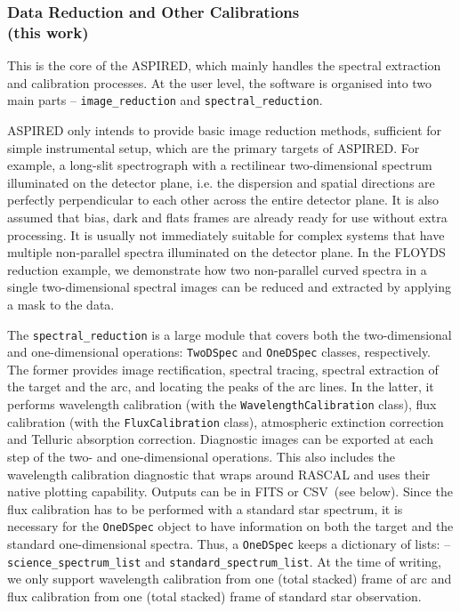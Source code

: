 \documentclass[linenumbers, twocolumn]{aastex631}
\begin{document}
\subsubsection*{Data Reduction and Other Calibrations\\(this work)}
This is the core of the \textsc{ASPIRED}, which mainly handles the spectral
extraction and calibration processes. At the user level, the software is
organised into two main parts -- \texttt{image\_reduction} and
\texttt{spectral\_reduction}.

\textsc{ASPIRED} only intends to provide basic image reduction methods,
sufficient for simple instrumental setup, which are the primary targets of
\textsc{ASPIRED}. For example, a long-slit spectrograph with a rectilinear
two-dimensional spectrum illuminated on the detector plane, i.e. the dispersion
and spatial directions are perfectly perpendicular to each other across the
entire detector plane. It is also assumed that bias, dark and flats frames
are already ready for use without extra processing. It is usually not
immediately suitable for complex systems that have multiple non-parallel
spectra illuminated on the detector plane. In the FLOYDS reduction example,
we demonstrate how two non-parallel curved spectra in a single two-dimensional
spectral images can be reduced and extracted by applying a mask to the data.

The \texttt{spectral\_reduction} is a large module that covers both the
two-dimensional and one-dimensional operations: \texttt{TwoDSpec} and
\texttt{OneDSpec} classes, respectively. The former provides image
rectification, spectral tracing, spectral extraction of the target and the
arc, and locating the peaks of the arc lines. In the latter, it performs
wavelength calibration (with the \texttt{WavelengthCalibration} class),
flux calibration (with the \texttt{FluxCalibration} class), atmospheric
extinction correction and Telluric absorption correction. Diagnostic images
can be exported at each step of the two- and one-dimensional operations.
This also includes the wavelength calibration diagnostic that wraps around
\textsc{RASCAL} and uses their native plotting capability. Outputs can be
in FITS or CSV~(see below). Since the flux calibration has to be performed
with a standard star spectrum, it is necessary for the \texttt{OneDSpec}
object to have information on both the target and the standard one-dimensional
spectra. Thus, a \texttt{OneDSpec} keeps a dictionary of lists: --
\texttt{science\_spectrum\_list} and \texttt{standard\_spectrum\_list}. At the
time of writing, we only support wavelength calibration from one (total
stacked) frame of arc and flux calibration from one (total stacked) frame
of standard star observation.
\end{document}
